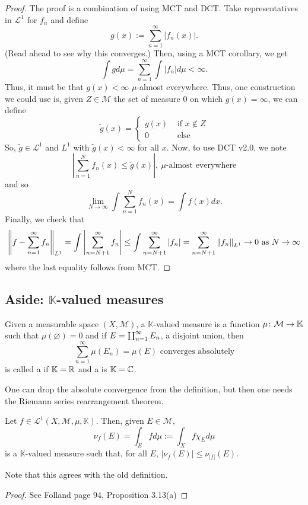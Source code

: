 \documentclass[11pt,leqno,oneside]{amsbook}
\numberwithin{thm}{section}
\newcommand{\M}{\mathcal{M}}
\newcommand{\cL}{\mathcal{L}}
\newcommand{\K}{\mathbb{K}} %
\renewcommand{\emptyset}{\varnothing}
\begin{document}
\begin{proof}
  The proof is a combination of using MCT and DCT. Take representatives
  in \(\cL^1\) for \(f_n\) and define \[
    g(x) := \sum_{n=1}^\infty |f_n(x)|.
  \]
  (Read ahead to see why this converges.) Then, using a MCT corollary, we
  get \[
    \int g d\mu = \sum_{n=1}^\infty \int |f_n| d\mu < \infty.
  \]
  Thus, it must be that \(g(x) < \infty\) \(\mu\)-almost everywhere.
  Thus, one construction we could use is, given \(Z \in \M\) the set
  of measure 0 on which \(g(x) = \infty\), we can define \[
    \tilde{g}(x) =
    \begin{cases}
      g(x) & \text{ if } x \not\in Z \\
      0 & \text{ else }
    \end{cases}
  \]
  So, \(\tilde{g} \in \cL^1\) and \(L^1\) with \(\tilde{g}(x) <
  \infty\) for all \(x\). Now, to use DCT v2.0, we note \[
    \left| \sum_{n=1}^N f_n(x) \leq \tilde{g}(x) \right|, \
    \mu\text{-almost everywhere}
  \]
  and so \[
    \lim_{N \to \infty} \int \sum_{n=1}^N f_n(x) = \int f(x) dx.
  \]
  Finally, we check that \[
    \norm[f - \sum_{n=1}^\infty f_n]_{L^1} = \int \left|
      \sum_{n=N+1}^\infty f_n \right| \leq \int \sum_{n=N+1}^\infty
    |f_n| = \sum_{n=N+1}^\infty \norm[f_n]_{L^1} \to 0 \text{ as } N
    \to \infty
  \]
  where the last equality follows from MCT.
\end{proof}
\subsection{Aside: \(\K\)-valued measures}
\begin{defn}
  Given a measurable space \((X,\M)\), a \(\K\)-valued measure is a
  function \(\mu \from \M \to \K\) such that \(\mu(\emptyset) = 0\)
  and if \(E = \Dunion_{n=1}^\infty E_n\), a disjoint union, then \[
    \sum_{n=1}^\infty \mu(E_n) = \mu(E) \text{ converges absolutely}
  \]
  is called a  if \(\K=\R\) and a \de{complex
    measure} is \(\K=\C\). 
\end{defn}
\begin{rmk}
  One can drop the absolute convergence from the definition, but then
  one needs the Riemann series rearrangement theorem.
\end{rmk}
\begin{prop}
  Let \(f \in \cL^1(X,\M,\mu,\K)\). Then, given \(E \in \M\), \[
    \nu_f(E) = \int_E f d\mu := \int_X f \chi_E d\mu
  \]
  is a \(\K\)-valued measure such that, for all \(E\), \(|\nu_f(E)|
  \leq \nu_{|f|}(E)\). 
\end{prop}
Note that this agrees with the old definition.
\begin{proof}
  See Folland page 94, Proposition 3.13(a)
\end{proof}
\end{document}

